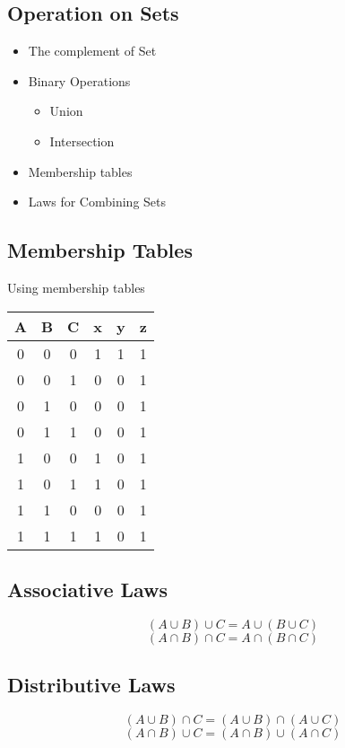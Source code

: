 \subsection*{Operation on Sets}

\begin{itemize}
\item The complement of Set
\item Binary Operations
\begin{itemize}
\item Union
\item Intersection
\end{itemize}
\item Membership tables
\item Laws for Combining Sets
\end{itemize}
\subsection*{Membership Tables}
Using membership tables
\begin{tabular}{|ccc|c|c|c|}
\hline
A & B & C & x & y & z \\\hline
0 & 0 & 0 & 1 & 1 & 1 \\
0 & 0 & 1 & 0 & 0 & 1 \\
0 & 1 & 0 & 0 & 0 & 1 \\
0 & 1 & 1 & 0 & 0 & 1 \\
1 & 0 & 0 & 1 & 0 & 1 \\
1 & 0 & 1 & 1 & 0 & 1 \\
1 & 1 & 0 & 0 & 0 & 1 \\
1 & 1 & 1 & 1 & 0 & 1 \\
\hline
\end{tabular}


\subsection*{Associative Laws}
\[ (A \cup B) \cup C =  A \cup (B \cup C)  \]
\[ (A \cap B) \cap C =  A \cap (B \cap C)  \]

\subsection*{Distributive Laws}
\[ (A \cup B) \cap C =  (A \cup B) \cap (A \cup C)  \]
\[ (A \cap B) \cup C =  (A \cap B) \cup (A \cap C)  \]


